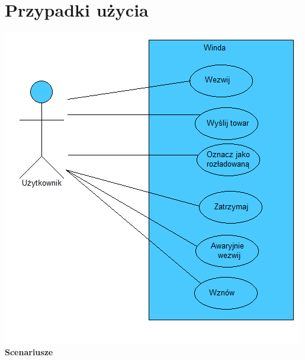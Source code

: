 \documentclass[a4paper,11pt]{article}
\begin{document}
\section{Przypadki użycia}
\includegraphics{images/useCase.png} 
\textbf{Scenariusze} \\
\end{document}
